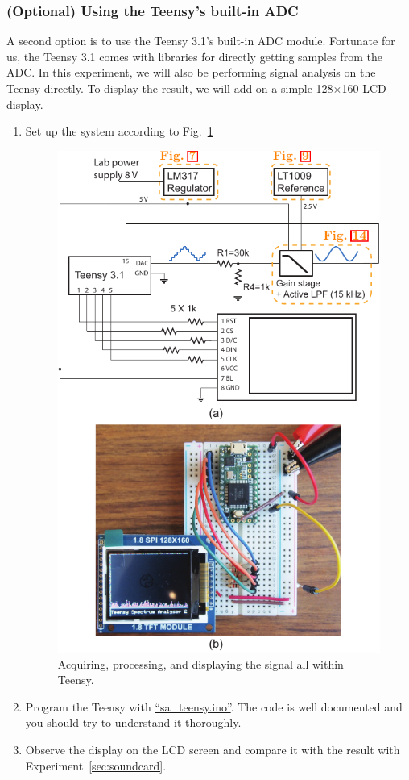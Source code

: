 \documentclass[letterpaper, 11pt]{article}
\begin{document}
\subsubsection{(Optional) Using the Teensy's built-in ADC}
\label{sec:teensy-sa}

A second option is to use the Teensy 3.1's built-in ADC module. Fortunate for us, the Teensy 3.1 comes with libraries for directly getting samples from the ADC. In this experiment, we will also be performing signal analysis on the Teensy directly. To display the result, we will add on a simple 128$\times$160 LCD display. 

\begin{enumerate}
	\item Set up the system according to Fig.~\ref{fig:audio-2}
			\begin{figure}[ht]
				\includegraphics[width=4.5in]{audio-2}
				\caption{Acquiring, processing, and displaying the signal all within Teensy.}
				\label{fig:audio-2}
			\end{figure}
			
	\item Program the Teensy with \href{https://github.com/ucdart/UCD-EEC134/blob/master/labs/lab1/code/sa_teensy/sa_teensy.ino}{``sa\_teensy.ino''}. The code is well documented and you should try to understand it thoroughly. 
	
	\item Observe the display on the LCD screen and compare it with the result with Experiment~\ref{sec:soundcard}.
\end{enumerate}
\end{document}
